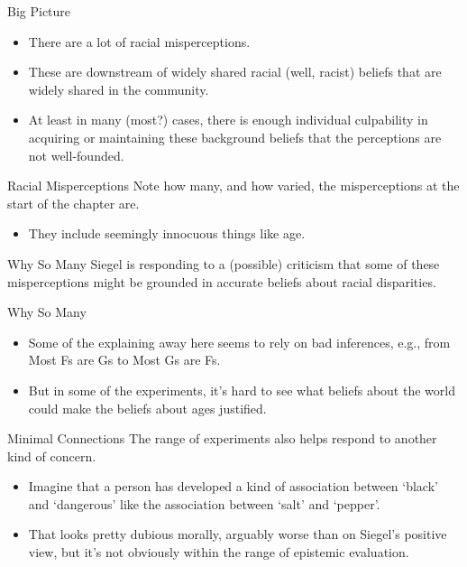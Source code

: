 \documentclass[
  17pt,
  letterpaper,
  ignorenonframetext,
  aspectratio=169,
  xcolor={dvipsnames}]{beamer}
\providecommand{\tightlist}{%
  \setlength{\itemsep}{0pt}\setlength{\parskip}{0pt}}\usepackage{longtable,booktabs,array}
\begin{document}
\begin{frame}{Big Picture}
\protect\hypertarget{big-picture}{}
\begin{itemize}[<+->]
\tightlist
\item
  There are a lot of racial misperceptions.
\item
  These are downstream of widely shared racial (well, racist) beliefs
  that are widely shared in the community.
\item
  At least in many (most?) cases, there is enough individual culpability
  in acquiring or maintaining these background beliefs that the
  perceptions are not well-founded.
\end{itemize}
\end{frame}

\begin{frame}{Racial Misperceptions}
\protect\hypertarget{racial-misperceptions-1}{}
Note how many, and how varied, the misperceptions at the start of the
chapter are.

\begin{itemize}[<+->]
\tightlist
\item
  They include seemingly innocuous things like age.
\end{itemize}
\end{frame}

\begin{frame}{Why So Many}
\protect\hypertarget{why-so-many}{}
Siegel is responding to a (possible) criticism that some of these
misperceptions might be grounded in accurate beliefs about racial
disparities.
\end{frame}

\begin{frame}{Why So Many}
\protect\hypertarget{why-so-many-1}{}
\begin{itemize}[<+->]
\tightlist
\item
  Some of the explaining away here seems to rely on bad inferences,
  e.g., from Most Fs are Gs to Most Gs are Fs.
\item
  But in some of the experiments, it's hard to see what beliefs about
  the world could make the beliefs about ages justified.
\end{itemize}
\end{frame}

\begin{frame}{Minimal Connections}
\protect\hypertarget{minimal-connections}{}
The range of experiments also helps respond to another kind of concern.

\begin{itemize}[<+->]
\tightlist
\item
  Imagine that a person has developed a kind of association between
  `black' and `dangerous' like the association between `salt' and
  `pepper'.
\item
  That looks pretty dubious morally, arguably worse than on Siegel's
  positive view, but it's not obviously within the range of epistemic
  evaluation.
\end{itemize}
\end{frame}
\end{document}

